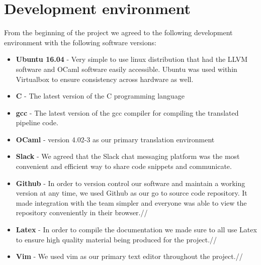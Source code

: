 \documentclass[./Report_main.tex]{subfiles}
\begin{document}
\section{Development environment}
From the beginning of the project we agreed to the following development environment with the following software versions:
\begin{itemize}
\item \textbf{Ubuntu 16.04} - Very simple to use linux distribution that had the LLVM software and OCaml
software easily accessible. Ubuntu was used within Virtualbox to ensure consistency across hardware
as well.\\
\item \textbf{C} - The latest version of the C programming language\\
\item \textbf{gcc} - The latest version of the gcc compiler for compiling the translated pipeline code.\\
\item \textbf{OCaml} - version 4.02-3 as our primary translation environment\\
\item \textbf{Slack} - We agreed that the Slack chat messaging platform was the most convenient and efficient way to share code snippets and communicate.
\item \textbf{Github} - In order to version control our software and maintain a working version at any time, we used Github as our go to source code repository. It made integration with the team simpler and everyone was able to view the repository conveniently in their browser.//
\item \textbf{Latex} - In order to compile the documentation we made sure to all use Latex to ensure high quality material being produced for the project.//
\item \textbf{Vim} - We used vim as our primary text editor throughout the project.//
\end{itemize}
\end{document}
